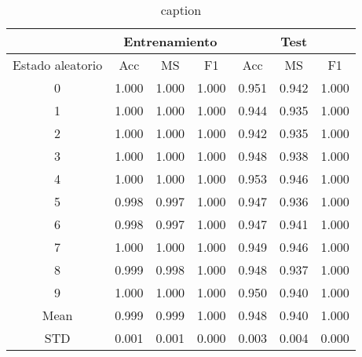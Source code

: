 \begin{table}[th]
	\centering
	\begin{tabular}{ |c|c|c|c|c|c|c| }
		\hline
		\rowcolor{LightCyan}
		 & \multicolumn{3}{c|}{Entrenamiento} & \multicolumn{3}{c|}{Test} \\
		\hline
		\rowcolor{LightCyan}
		 Estado aleatorio & Acc & MS & F1 & Acc & MS & F1 \\
		\hline
		0 & 1.000 & 1.000 & 1.000 & 0.951 & 0.942 & 1.000 \\
		1 & 1.000 & 1.000 & 1.000 & 0.944 & 0.935 & 1.000 \\
		2 & 1.000 & 1.000 & 1.000 & 0.942 & 0.935 & 1.000 \\
		3 & 1.000 & 1.000 & 1.000 & 0.948 & 0.938 & 1.000 \\
		4 & 1.000 & 1.000 & 1.000 & 0.953 & 0.946 & 1.000 \\
		5 & 0.998 & 0.997 & 1.000 & 0.947 & 0.936 & 1.000 \\
		6 & 0.998 & 0.997 & 1.000 & 0.947 & 0.941 & 1.000 \\
		7 & 1.000 & 1.000 & 1.000 & 0.949 & 0.946 & 1.000 \\
		8 & 0.999 & 0.998 & 1.000 & 0.948 & 0.937 & 1.000 \\
		9 & 1.000 & 1.000 & 1.000 & 0.950 & 0.940 & 1.000 \\
		Mean & 0.999 & 0.999 & 1.000 & 0.948 & 0.940 & 1.000 \\
		STD & 0.001 & 0.001 & 0.000 & 0.003 & 0.004 & 0.000 \\
		\hline
	\end{tabular}
	\caption{caption}
	\label{label}
\end{table}
